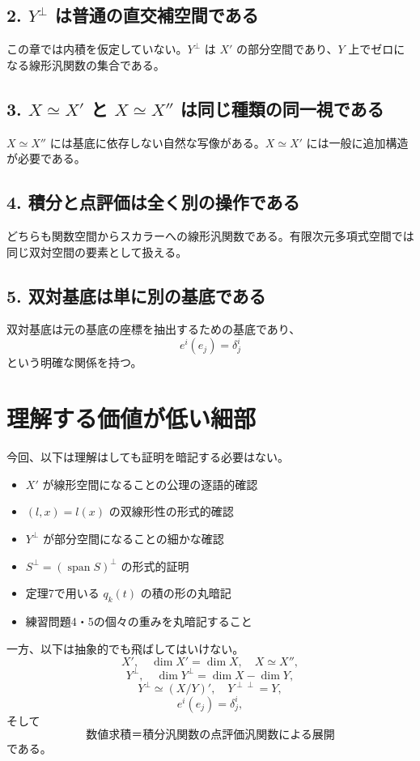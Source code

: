 \documentclass[a4paper,11pt]{ltjsarticle}
\newcommand{\Span}{\operatorname{span}}
\begin{document}
\subsection*{2. $Y^\perp$ は普通の直交補空間である}
この章では内積を仮定していない。$Y^\perp$ は $X'$ の部分空間であり、$Y$ 上でゼロになる線形汎関数の集合である。

\subsection*{3. $X\simeq X'$ と $X\simeq X''$ は同じ種類の同一視である}
$X\simeq X''$ には基底に依存しない自然な写像がある。$X\simeq X'$ には一般に追加構造が必要である。

\subsection*{4. 積分と点評価は全く別の操作である}
どちらも関数空間からスカラーへの線形汎関数である。有限次元多項式空間では同じ双対空間の要素として扱える。

\subsection*{5. 双対基底は単に別の基底である}
双対基底は元の基底の座標を抽出するための基底であり、
\[
e^i(e_j)=\delta^i_j
\]
という明確な関係を持つ。

\section{理解する価値が低い細部}

今回、以下は理解はしても証明を暗記する必要はない。
\begin{itemize}
  \item $X'$ が線形空間になることの公理の逐語的確認
  \item $(l,x)=l(x)$ の双線形性の形式的確認
  \item $Y^\perp$ が部分空間になることの細かな確認
  \item $S^\perp=(\Span S)^\perp$ の形式的証明
  \item 定理7で用いる $q_k(t)$ の積の形の丸暗記
  \item 練習問題4・5の個々の重みを丸暗記すること
\end{itemize}

一方、以下は抽象的でも飛ばしてはいけない。
\[
X',\quad \dim X'=\dim X,\quad X\simeq X'',
\]
\[
Y^\perp,\quad \dim Y^\perp=\dim X-\dim Y,
\]
\[
Y^\perp\simeq(X/Y)',\quad Y^{\perp\perp}=Y,
\]
\[
e^i(e_j)=\delta^i_j,
\]
そして
\[
\boxed{\text{数値求積＝積分汎関数の点評価汎関数による展開}}
\]
である。
\end{document}
